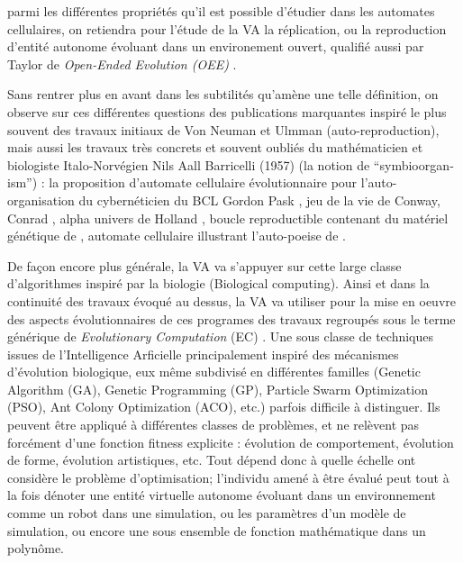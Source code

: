 parmi les différentes propriétés qu'il est possible d'étudier dans les automates cellulaires, on retiendra pour l'étude de la VA la réplication, ou la reproduction  d'entité autonome évoluant dans un environement ouvert, qualifié aussi par Taylor de \textit{Open-Ended Evolution (OEE)} . 


Sans rentrer plus en avant dans les subtilités qu'amène une telle définition, on observe sur ces différentes questions des publications marquantes inspiré le plus souvent des travaux initiaux de Von Neuman et Ulmman (auto-reproduction), mais aussi les travaux très concrets et souvent oubliés \autocites[111-130]{Dyson1997}{Fogel1998, Taylor1999, Hackett2014} du mathématicien et biologiste Italo-Norvégien Nils Aall Barricelli (1957) (la notion de \foreignquote{english}{symbioorganism}) : la proposition d'automate cellulaire évolutionnaire pour l'auto-organisation du cybernéticien du BCL Gordon Pask \autocite{Pask1961}, jeu de la vie de Conway, Conrad \textcite{Conrad1970}, alpha univers de Holland \autocite{Holland1976}, boucle reproductible contenant du matériel génétique de \textcite{Langton1984}, automate cellulaire illustrant l'auto-poeise de \textcite{Varela1974,McMullin1997b, McMullin1997, McMullin2004}.

De façon encore plus générale, la VA va s'appuyer sur cette large classe d'algorithmes inspiré par la biologie (Biological computing). Ainsi et dans la continuité des travaux évoqué au dessus, la VA va utiliser pour la mise en oeuvre des aspects évolutionnaires de ces programes des travaux regroupés sous le terme générique de \textit{Evolutionary Computation} (EC) \autocites{Back1997, Fogel1998, Fogel2006a}. Une sous classe de techniques issues de l'Intelligence Arficielle principalement inspiré des mécanismes d'évolution biologique, eux même subdivisé en différentes familles (Genetic Algorithm (GA), Genetic Programming (GP), Particle Swarm Optimization (PSO), Ant Colony Optimization (ACO), etc.) parfois difficile à distinguer. Ils peuvent être appliqué à différentes classes de problèmes, et ne relèvent pas forcément d'une fonction fitness explicite : évolution de comportement, évolution de forme, évolution artistiques, etc. Tout dépend donc à quelle échelle  ont considère le problème d'optimisation; l'individu amené à être évalué peut tout à la fois dénoter une entité virtuelle autonome évoluant dans un environnement comme un robot dans une simulation, ou les paramètres d'un modèle de simulation, ou encore une sous ensemble de fonction mathématique dans un polynôme.

